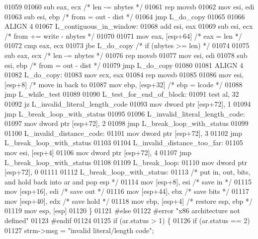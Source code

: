 \begin{DoxyCode}
{{{{{{{{{{{{{{{{{{{{{{{{{{{{{{{{{{{{{{{{{{{{{{{{{{{{{{{{{{{{{{{{{{{{{{{{{{{{{{{{{{{{{{{{{{{{{{{{{{{{{{{{{{{{{{{{{{{{{{{{{{{{{{{{{{{{{{{{{{{{{{{{{{{{{{{{{{{{{{{{{{{{{{{{{{{{{{{{{{{{{{{{{{{{{{{{{{{{{{{{{{{{{{{{{{{{{{{{{{{{{{{{{{{{{{{{{{{{{{{{{{{{{{{{{{{{{{{{{{{{{{{{{{{{{{{{{{{{{{{{{{{{{{{{{{{{{{{{{{{{{{{{{{{{{{{{{{{{{{{{{{{{{{{{{{{{{{{{{{{{{{{{{{{{{{{{{{{{{{{{{{{{{{{01059 
01060     sub eax, ecx         \textcolor{comment}{/* len -= nbytes */}
01061     rep     movsb
01062     mov esi, edi
01063     sub esi, ebp         \textcolor{comment}{/* from = out - dist */}
01064     jmp L\_do\_copy
01065 
01066 ALIGN 4
01067 L\_contiguous\_in\_window:
01068     add esi, eax
01069     sub esi, ecx         \textcolor{comment}{/* from += write - nbytes */}
01070 
01071     mov eax, [esp+64]    \textcolor{comment}{/* eax = len */}
01072     cmp eax, ecx
01073     jbe L\_do\_copy          \textcolor{comment}{/* if (nbytes >= len) */}
01074 
01075     sub eax, ecx         \textcolor{comment}{/* len -= nbytes */}
01076     rep     movsb
01077     mov esi, edi
01078     sub esi, ebp         \textcolor{comment}{/* from = out - dist */}
01079     jmp L\_do\_copy
01080 
01081 ALIGN 4
01082 L\_do\_copy:
01083     mov ecx, eax
01084     rep     movsb
01085 
01086     mov esi, [esp+8]      \textcolor{comment}{/* move in back to %
01087     mov ebp, [esp+32]     \textcolor{comment}{/* ebp = lcode */}
01088     jmp L\_while\_test
01089 
01090 L\_test\_for\_end\_of\_block:
01091     test    al, 32
01092     jz  L\_invalid\_literal\_length\_code
01093     mov dword ptr [esp+72], 1
01094     jmp L\_break\_loop\_with\_status
01095 
01096 L\_invalid\_literal\_length\_code:
01097     mov dword ptr [esp+72], 2
01098     jmp L\_break\_loop\_with\_status
01099 
01100 L\_invalid\_distance\_code:
01101     mov dword ptr [esp+72], 3
01102     jmp L\_break\_loop\_with\_status
01103 
01104 L\_invalid\_distance\_too\_far:
01105     mov esi, [esp+4]
01106     mov dword ptr [esp+72], 4
01107     jmp L\_break\_loop\_with\_status
01108 
01109 L\_break\_loop:
01110     mov dword ptr [esp+72], 0
01111 
01112 L\_break\_loop\_with\_status:
01113 \textcolor{comment}{/* put in, out, bits, and hold back into ar and pop esp */}
01114     mov [esp+8], esi     \textcolor{comment}{/* save in */}
01115     mov [esp+16], edi    \textcolor{comment}{/* save out */}
01116     mov [esp+44], ebx    \textcolor{comment}{/* save bits */}
01117     mov [esp+40], edx    \textcolor{comment}{/* save hold */}
01118     mov ebp, [esp+4]     \textcolor{comment}{/* restore esp, ebp */}
01119     mov esp, [esp]
01120     \}
01121 \textcolor{preprocessor}{#else}
01122 \textcolor{preprocessor}{#error "x86 architecture not defined"}
01123 \textcolor{preprocessor}{#endif}
01124 
01125     \textcolor{keywordflow}{if} (ar.status > 1) \{
01126         \textcolor{keywordflow}{if} (ar.status == 2)
01127             strm->msg = \textcolor{stringliteral}{"invalid literal/length code"};
}}}}}}}}}}}}}}}}}}}}}}}}}}}}}}}}}}}}}}}}}}}}}}}}}}}}}}}}}}}}}}}}}}}}}}}}}}}}}}}}}}}}}}}}}}}}}}}}}}}}}}}}}}}}}}}}}}}}}}}}}}}}}}}}}}}}}}}}}}}}}}}}}}}}}}}}}}}}}}}}}}}}}}}}}}}}}}}}}}}}}}}}}}}}}}}}}}}}}}}}}}}}}}}}}}}}}}}}}}}}}}}}}}}}}}}}}}}}}}}}}}}}}}}}}}}}}}}}}}}}}}}}}}}}}}}}}}}}}}}}}}}}}}}}}}}}}}}}}}}}}}}}}}}}}}}}}}}}}}}}}}}}}}}}}}}}}}}}}}}}}}}}}}}}}}}}}}}}}}}}}}}}}}}}
\end{DoxyCode}
